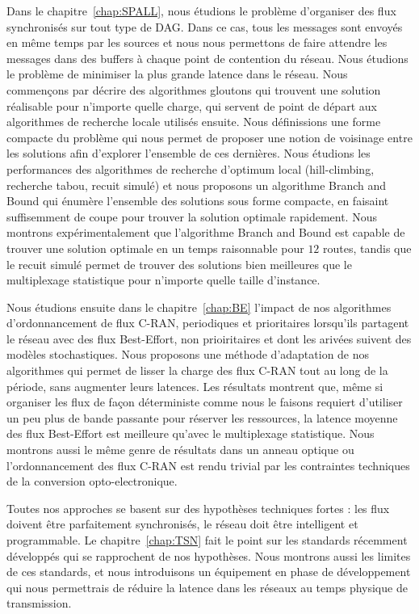 Dans le chapitre~\ref{chap:SPALL}, nous étudions le problème d'organiser des flux synchronisés sur tout type de DAG. Dans ce cas, tous les messages sont envoyés en même temps par les sources et nous nous permettons de faire attendre les messages dans des buffers à chaque point de contention du réseau. Nous étudions le problème de minimiser la plus grande latence dans le réseau. Nous commençons par décrire des algorithmes gloutons qui trouvent une solution réalisable pour n'importe quelle charge, qui servent de point de départ aux algorithmes de recherche locale utilisés ensuite. Nous définissions une forme compacte du problème qui nous permet de proposer une notion de voisinage entre les solutions afin d'explorer l'ensemble de ces dernières. Nous étudions les performances des algorithmes de recherche d'optimum local (hill-climbing, recherche tabou, recuit simulé) et nous proposons un algorithme Branch and Bound qui énumère l'ensemble des solutions sous forme compacte, en faisaint  suffisemment de coupe pour trouver la solution optimale rapidement. Nous montrons expérimentalement que l'algorithme Branch and Bound est capable de trouver une solution optimale en un temps raisonnable pour $12$ routes, tandis que le recuit simulé permet de trouver des solutions bien meilleures que le multiplexage statistique pour n'importe quelle taille d'instance.

Nous étudions ensuite dans le chapitre~\ref{chap:BE} l'impact de nos algorithmes d'ordonnancement de flux C-RAN, periodiques et prioritaires lorsqu'ils partagent le réseau avec des flux Best-Effort, non prioiritaires et dont les arivées suivent des modèles stochastiques. Nous proposons une méthode d'adaptation de nos algorithmes qui permet de lisser la charge des flux C-RAN tout au long de la période, sans augmenter leurs latences. Les résultats montrent que, même si organiser les flux de façon déterministe comme nous le faisons requiert d'utiliser un peu plus de bande passante pour réserver les ressources, la latence moyenne des flux Best-Effort est meilleure qu'avec le multiplexage statistique. Nous montrons aussi le même genre de résultats dans un anneau optique ou l'ordonnancement des flux C-RAN est rendu trivial par les contraintes techniques de la conversion opto-electronique.

Toutes nos approches se basent sur des hypothèses techniques fortes : les flux doivent être parfaitement synchronisés, le réseau doit être intelligent et programmable. Le chapitre~\ref{chap:TSN} fait le point sur les standards récemment développés qui se rapprochent de nos hypothèses. Nous montrons aussi les limites de ces standards, et nous introduisons un équipement en phase de développement qui nous permettrais de réduire la latence dans les réseaux au temps physique de transmission.




